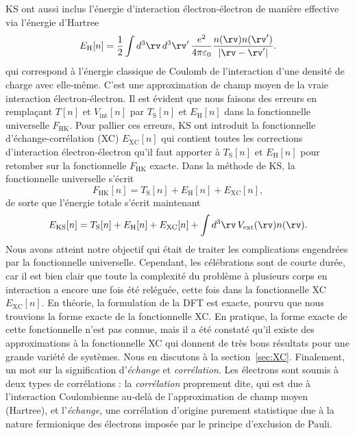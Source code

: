 KS ont aussi inclus l'énergie d'interaction électron-électron de manière effective via l'énergie d'Hartree~\cite{hartreeWaveMechanicsAtom1928,hartreeWaveMechanicsAtom1928a,fockNaeherungsmethodeZurLoesung1930}
\begin{equation}
    \label{eqn:c2_EH}
    E_\text{H}[n]=\frac{1}{2}\int d^3\rv\,d^3\rv'\,\frac{e^2}{4\pi\varepsilon_0}\frac{n(\rv)n(\rv')}{|\rv-\rv'|}.
\end{equation}
qui correspond à l'énergie classique de Coulomb de 
l'interaction d'une densité de charge avec elle-même. C'est une 
approximation de champ moyen de la vraie interaction électron-électron. Il est évident que nous faisons des erreurs en remplaçant $T[n]$ et $V_\text{int}[n]$ par $T_\text{S}[n]$ et $E_\text{H}[n]$ dans la fonctionnelle universelle $F_\text{HK}$. Pour pallier ces erreurs, KS ont introduit la fonctionnelle d'échange-corrélation (XC) $E_\text{XC}[n]$ qui contient toutes les corrections d'interaction électron-électron qu'il faut apporter à $T_\text{S}[n]$ et $E_\text{H}[n]$ pour retomber sur la fonctionnelle $F_\text{HK}$ exacte. Dans la méthode de KS, la fonctionnelle universelle s'écrit
\begin{equation}
    \label{eqn:c2_FHK_KS}
    F_\text{HK}[n]=T_\text{S}[n]+E_\text{H}[n]+E_\text{XC}[n],
\end{equation}
de sorte que l'énergie totale s'écrit maintenant
\begin{equation}
    \label{eqn:c2_EKS}
    E_\text{KS}[n]=T_\text{S}[n]+E_\text{H}[n]+E_\text{XC}[n]+\int d^3\rv\,V_\text{ext}(\rv)n(\rv).
\end{equation}
Nous avons atteint notre objectif qui était de traiter les complications engendrées par la fonctionnelle universelle. Cependant, les célébrations sont de courte durée, car il est bien clair que toute la complexité du problème à plusieurs corps en interaction a encore une fois été reléguée, cette fois dans la fonctionnelle XC $E_\text{XC}[n]$. En théorie, la formulation de la DFT est exacte, pourvu que nous trouvions la forme exacte de la fonctionnelle XC. En pratique, la forme exacte de cette fonctionnelle n'est pas connue, mais il a été constaté qu'il existe des approximations à la fonctionnelle XC qui donnent de très bons résultats pour une grande variété de systèmes. Nous en discutons à la section~\ref{sec:XC}. Finalement, un mot sur la signification d'\textit{échange} et \textit{corrélation}. Les électrons sont soumis à deux types de corrélations : la \textit{corrélation} proprement dite, qui est due à l'interaction Coulombienne au-delà de l'approximation de champ moyen (Hartree), et l'\textit{échange}, une corrélation d'origine purement statistique due à la nature fermionique des électrons imposée par le principe d'exclusion de Pauli. 


